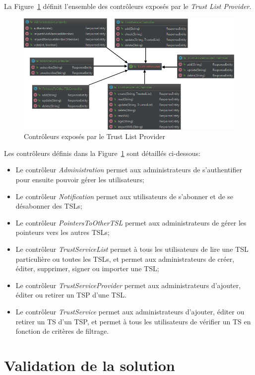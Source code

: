 \documentclass{tnreport}
\begin{document}
La Figure~\ref{fig:rest-controllers} définit l'ensemble des contrôleurs exposés par le \textit{Trust List Provider}.

\clearpage
\begin{figure}[h]
	\centering
	\includegraphics[scale=0.73]{figures/rest-controllers}
	\caption{Contrôleurs exposés par le Trust List Provider}
	\label{fig:rest-controllers}
\end{figure}

Les contrôleurs définis dans la Figure~\ref{fig:rest-controllers} sont détaillés ci-dessous:
\begin{itemize}
	\item Le contrôleur \textit{Administration} permet aux administrateurs de s'authentifier pour ensuite pouvoir gérer les utilisateurs;
	\item Le contrôleur \textit{Notification} permet aux utilisateurs de s'abonner et de se désabonner des TSLs;
	\item Le contrôleur \textit{PointersToOtherTSL} permet aux administrateurs de gérer les pointeurs vers les autres TSLs;
	\item Le contrôleur \textit{TrustServiceList} permet à tous les utilisateurs de lire une TSL particulière ou toutes les TSLs, et permet aux administrateurs de créer, éditer, supprimer, signer ou importer une TSL;
	\item Le contrôleur \textit{TrustServiceProvider} permet aux administrateurs d'ajouter, éditer ou retirer un TSP d'une TSL.
	\item Le contrôleur \textit{TrustService} permet aux administrateurs d'ajouter, éditer ou retirer un TS d'un TSP, et permet à tous les utilisateurs de vérifier un TS en fonction de critères de filtrage.
\end{itemize}

\section{Validation de la solution}
\end{document}
